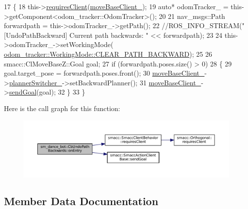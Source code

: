 \begin{DoxyCode}
17   \{
18     this->\hyperlink{classsmacc_1_1SmaccClientBehavior_a917f001e763a1059af337bf4e164f542}{requiresClient}(\hyperlink{classsm__dance__bot_1_1CbUndoPathBackwards_af79da57bfb5ecd6b20af32e44d4b9ca9}{moveBaseClient\_});
19     \textcolor{keyword}{auto}* odomTracker\_ = this->getComponent<odom\_tracker::OdomTracker>();
20 
21     nav\_msgs::Path forwardpath = this->odomTracker\_->getPath();
22     \textcolor{comment}{//ROS\_INFO\_STREAM("[UndoPathBackward] Current path backwards: " << forwardpath);}
23 
24     this->odomTracker\_->setWorkingMode(
      \hyperlink{namespaceodom__tracker_a4daf27fd157b1a481fdfd6f90de00b88a0cf8f27617189e35619df3c18bda6274}{odom\_tracker::WorkingMode::CLEAR\_PATH\_BACKWARD});
25 
26     smacc::ClMoveBaseZ::Goal goal;
27     \textcolor{keywordflow}{if} (forwardpath.poses.size() > 0)
28     \{
29       goal.target\_pose = forwardpath.poses.front();
30       \hyperlink{classsm__dance__bot_1_1CbUndoPathBackwards_af79da57bfb5ecd6b20af32e44d4b9ca9}{moveBaseClient\_}->\hyperlink{classsmacc_1_1ClMoveBaseZ_a712e0df77c9629930e03cbb4c539b485}{plannerSwitcher\_}->setBackwardPlanner();
31       \hyperlink{classsm__dance__bot_1_1CbUndoPathBackwards_af79da57bfb5ecd6b20af32e44d4b9ca9}{moveBaseClient\_}->\hyperlink{classsmacc_1_1SmaccActionClientBase_a58c67a87c5fb8ea1633573c58fe3eee1}{sendGoal}(goal);
32     \}
33   \}
\end{DoxyCode}


Here is the call graph for this function\+:
\nopagebreak
\begin{figure}[H]
\begin{center}
\leavevmode
\includegraphics[width=350pt]{classsm__dance__bot_1_1CbUndoPathBackwards_a5ecdf83df96ab3d74eb4e4febea7fa74_cgraph}
\end{center}
\end{figure}




\subsection{Member Data Documentation}
